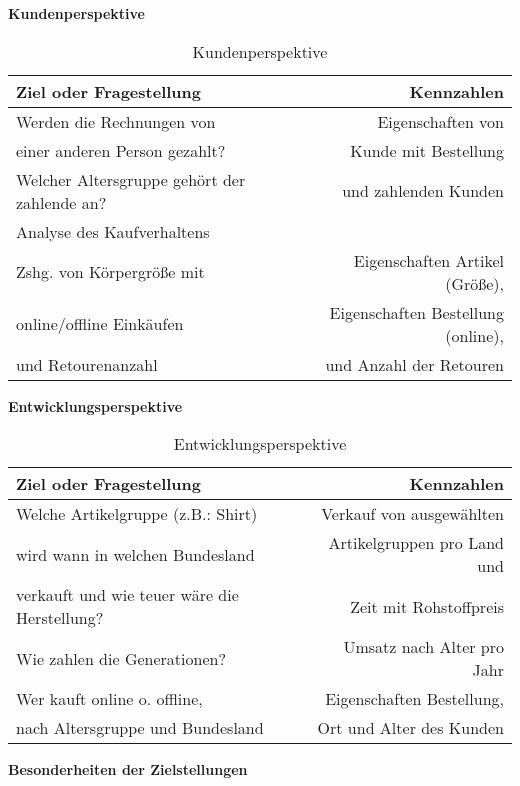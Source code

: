 \begin{table}[htbp]
\textbf{Kundenperspektive}
\begin{center}
  \begin{tabular}{ | l | r | }
    \hline
    \textbf{Ziel oder Fragestellung} & \textbf{Kennzahlen} \\ \hline
	Werden die Rechnungen von & Eigenschaften von \\ einer anderen Person gezahlt?   & Kunde mit Bestellung \\  Welcher Altersgruppe gehört der zahlende an?  & und zahlenden Kunden \\ Analyse des Kaufverhaltens & 
    \\ \hline
    Zshg. von Körpergröße mit & Eigenschaften Artikel (Größe), \\ online/offline Einkäufen & Eigenschaften Bestellung (online), \\ und Retourenanzahl & und Anzahl der Retouren \\ \hline
  \end{tabular}
\end{center}
\caption{Kundenperspektive}
\label{table:tableKunde}
\end{table}

\pagebreak 

\begin{table}[htbp]
\textbf{Entwicklungsperspektive}
\begin{center}
  \begin{tabular}{ | l | r | }
    \hline
    \textbf{Ziel oder Fragestellung} & \textbf{Kennzahlen} \\ \hline
    Welche Artikelgruppe (z.B.: Shirt) & Verkauf von ausgewählten \\ wird wann in welchen Bundesland &   Artikelgruppen pro Land und \\ verkauft und wie teuer wäre die Herstellung? & Zeit mit Rohstoffpreis \\ \hline
    Wie zahlen die Generationen? & Umsatz nach Alter pro Jahr \\ \hline
    Wer kauft online o. offline, & Eigenschaften Bestellung, \\ nach Altersgruppe und Bundesland & Ort und Alter des Kunden \\ \hline 
  \end{tabular}
\end{center}
\caption{Entwicklungsperspektive}
\label{table:tableEntwicklung}
\end{table}
\vspace{1.0cm}
\textbf{Besonderheiten der Zielstellungen}

